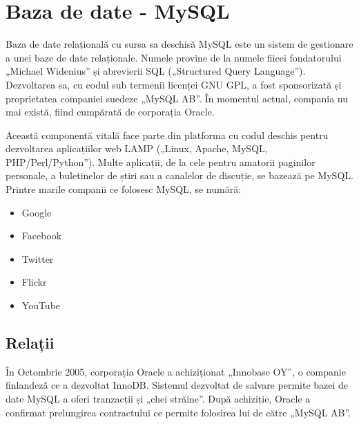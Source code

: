 \section{Baza de date - MySQL}



	Baza de date relațională cu sursa sa deschisă MySQL este un sistem de gestionare a unei baze de date relaționale.
	Numele provine de la numele fiicei fondatorului „Michael Widenius”\cite{mysql_reference} și abrevierii SQL („Structured Query Language”).
	Dezvoltarea sa, cu codul sub termenii licenței GNU GPL, a fost sponsorizată și proprietatea companiei suedeze „MySQL AB”.
	În momentul actual, compania nu mai există, fiind cumpărată de corporația Oracle.

	Această componentă vitală face parte din platforma cu codul deschis pentru dezvoltarea aplicațiilor web LAMP („Linux, Apache, MySQL, PHP/Perl/Python”).
	Multe aplicații, de la cele pentru amatorii paginilor personale, a buletinelor de știri sau a canalelor de discuție, se bazează pe MySQL.
	Printre marile companii ce folosesc MySQL, se numără:
	\begin{itemize}
		\item Google
		\item Facebook
		\item Twitter
		\item Flickr
		\item YouTube
	\end{itemize}


	\subsection{Relații}

	În Octombrie 2005, corporația Oracle a achiziționat „Innobase OY”, o companie finlandeză ce a dezvoltat InnoDB. \cite{innodb}
	Sistemul dezvoltat de salvare permite bazei de date MySQL a oferi tranzacții și „chei străine”.
	După achiziție, Oracle a confirmat prelungirea contractului ce permite folosirea lui de către „MySQL AB”.

